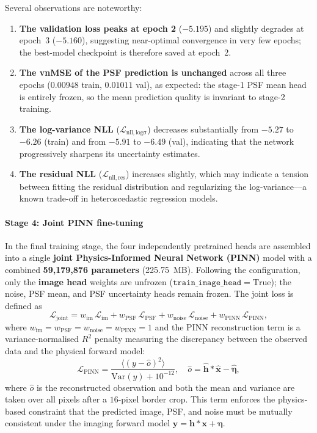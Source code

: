 \documentclass{aa}
\begin{document}
Several observations are noteworthy:
\begin{enumerate}
    \item \textbf{The validation loss peaks at epoch 2} ($-5.195$) and slightly degrades at epoch~3 ($-5.160$), suggesting near-optimal convergence in very few epochs; the best-model checkpoint is therefore saved at epoch~2.
    \item \textbf{The vnMSE of the PSF prediction is unchanged} across all three epochs ($0.00948$ train, $0.01011$ val), as expected: the stage-1 PSF mean head is entirely frozen, so the mean prediction quality is invariant to stage-2 training.
    \item \textbf{The log-variance NLL} ($\mathcal{L}_\mathrm{nll,log\sigma}$) decreases substantially from $-5.27$ to $-6.26$ (train) and from $-5.91$ to $-6.49$ (val), indicating that the network progressively sharpens its uncertainty estimates.
    \item \textbf{The residual NLL} ($\mathcal{L}_\mathrm{nll,res}$) increases slightly, which may indicate a tension between fitting the residual distribution and regularizing the log-variance---a known trade-off in heteroscedastic regression models.
\end{enumerate}

\paragraph{Stage 4: Joint PINN fine-tuning}

In the final training stage, the four independently pretrained heads are assembled into a single \textbf{joint Physics-Informed Neural Network (PINN)} model with a combined \textbf{59,179,876 parameters} (225.75~MB). Following the configuration, only the \textbf{image head} weights are unfrozen ($\texttt{train\_image\_head}=\mathrm{True}$); the noise, PSF mean, and PSF uncertainty heads remain frozen. The joint loss is defined as
\begin{equation}
\mathcal{L}_\mathrm{joint}
=
w_\mathrm{im}\,\mathcal{L}_\mathrm{im}
+
w_\mathrm{PSF}\,\mathcal{L}_\mathrm{PSF}
+
w_\mathrm{noise}\,\mathcal{L}_\mathrm{noise}
+
w_\mathrm{PINN}\,\mathcal{L}_\mathrm{PINN},
\end{equation}
where $w_\mathrm{im} = w_\mathrm{PSF} = w_\mathrm{noise} = w_\mathrm{PINN} = 1$ and the PINN reconstruction term is a variance-normalised $R^2$ penalty measuring the discrepancy between the observed data and the physical forward model:
\begin{equation}
\mathcal{L}_\mathrm{PINN}
=
\frac{\langle (y - \hat{o})^2 \rangle}{\mathrm{Var}(y) + 10^{-12}},
\quad
\hat{o} = \hat{\mathbf{h}} \ast \hat{\mathbf{x}} - \hat{\boldsymbol{\eta}},
\end{equation}
where $\hat{o}$ is the reconstructed observation and both the mean and variance are taken over all pixels after a $16$-pixel border crop. This term enforces the physics-based constraint that the predicted image, PSF, and noise must be mutually consistent under the imaging forward model $\mathbf{y} = \mathbf{h} \ast \mathbf{x} + \boldsymbol{\eta}$.
\end{document}
